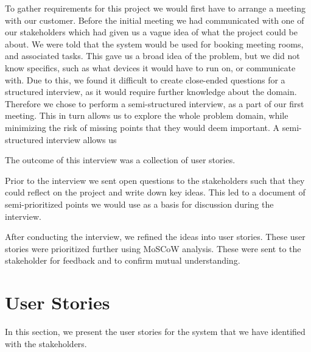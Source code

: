 To gather requirements for this project we would first have to arrange a meeting with our customer. 
Before the initial meeting we had communicated with one of our stakeholders which had given us a vague idea of what the project could be about.
We were told that the system would be used for booking meeting rooms, and associated tasks. This gave us a broad idea of the problem, but we did not know specifics, such as what devices it would have to run on, or communicate with.
Due to this, we found it difficult to create close-ended questions for a structured interview, as it would require further knowledge about the domain.
Therefore we chose to perform a semi-structured interview, as a part of our first meeting. 
This in turn allows us to explore the whole problem domain, while minimizing the risk of missing points that they would deem important. 
A semi-structured interview allows us 
\cite{InterviewsNHS}



The outcome of this interview was a collection of user stories.




Prior to the interview we sent open questions to the stakeholders such that they could reflect on the project and write down key ideas.
This led to a document of semi-prioritized points we would use as a basis for discussion during the interview.

After conducting the interview, we refined the ideas into user stories. These user stories were prioritized further using MoSCoW analysis.
These were sent to the stakeholder for feedback and to confirm mutual understanding.

\section{User Stories}
In this section, we present the user stories for the system that we have identified with the stakeholders.

